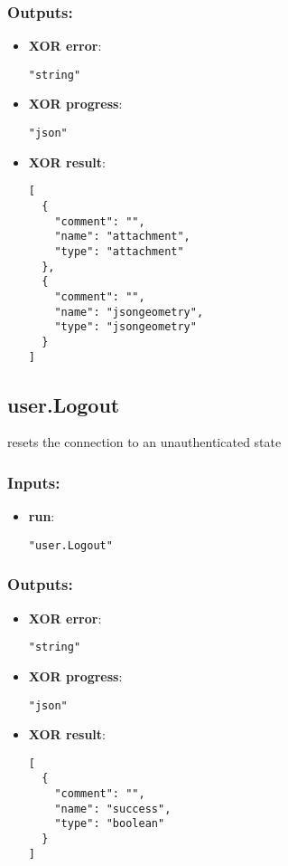 \subsubsection*{Outputs:}
\begin{itemize}
    \item \textbf{XOR error}: 
\begin{lstlisting}
"string"
\end{lstlisting}
    \item \textbf{XOR progress}: 
\begin{lstlisting}
"json"
\end{lstlisting}
    \item \textbf{XOR result}: 
\begin{lstlisting}
[
  {
    "comment": "", 
    "name": "attachment", 
    "type": "attachment"
  }, 
  {
    "comment": "", 
    "name": "jsongeometry", 
    "type": "jsongeometry"
  }
]
\end{lstlisting}
  \end{itemize}

\subsection{user.Logout}
resets the connection to an unauthenticated state
\subsubsection*{Inputs:}
\begin{itemize}
    \item \textbf{run}: 
\begin{lstlisting}
"user.Logout"
\end{lstlisting}
  \end{itemize}

\subsubsection*{Outputs:}
\begin{itemize}
    \item \textbf{XOR error}: 
\begin{lstlisting}
"string"
\end{lstlisting}
    \item \textbf{XOR progress}: 
\begin{lstlisting}
"json"
\end{lstlisting}
    \item \textbf{XOR result}: 
\begin{lstlisting}
[
  {
    "comment": "", 
    "name": "success", 
    "type": "boolean"
  }
]
\end{lstlisting}
  \end{itemize}

